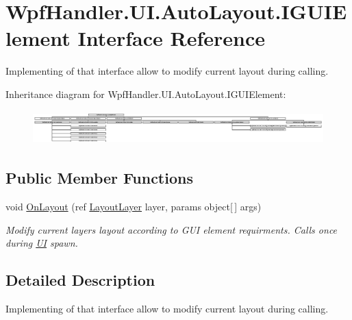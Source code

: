 \hypertarget{interface_wpf_handler_1_1_u_i_1_1_auto_layout_1_1_i_g_u_i_element}{}\section{Wpf\+Handler.\+U\+I.\+Auto\+Layout.\+I\+G\+U\+I\+Element Interface Reference}
\label{interface_wpf_handler_1_1_u_i_1_1_auto_layout_1_1_i_g_u_i_element}


Implementing of that interface allow to modify current layout during calling.  


Inheritance diagram for Wpf\+Handler.\+U\+I.\+Auto\+Layout.\+I\+G\+U\+I\+Element\+:\begin{figure}[H]
\begin{center}
\leavevmode
\includegraphics[height=1.317647cm]{da/db2/interface_wpf_handler_1_1_u_i_1_1_auto_layout_1_1_i_g_u_i_element}
\end{center}
\end{figure}
\subsection*{Public Member Functions}
\begin{DoxyCompactItemize}
\item 
void \mbox{\hyperlink{interface_wpf_handler_1_1_u_i_1_1_auto_layout_1_1_i_g_u_i_element_a0ff16956f8e8187d51e1b36b6b9f894e}{On\+Layout}} (ref \mbox{\hyperlink{class_wpf_handler_1_1_u_i_1_1_auto_layout_1_1_layout_layer}{Layout\+Layer}} layer, params object\mbox{[}$\,$\mbox{]} args)
\begin{DoxyCompactList}\small\item\em Modify current layer\textquotesingle{}s layout according to G\+UI element requirments. Calls once during \mbox{\hyperlink{namespace_wpf_handler_1_1_u_i}{UI}} spawn. \end{DoxyCompactList}\end{DoxyCompactItemize}


\subsection{Detailed Description}
Implementing of that interface allow to modify current layout during calling. 



